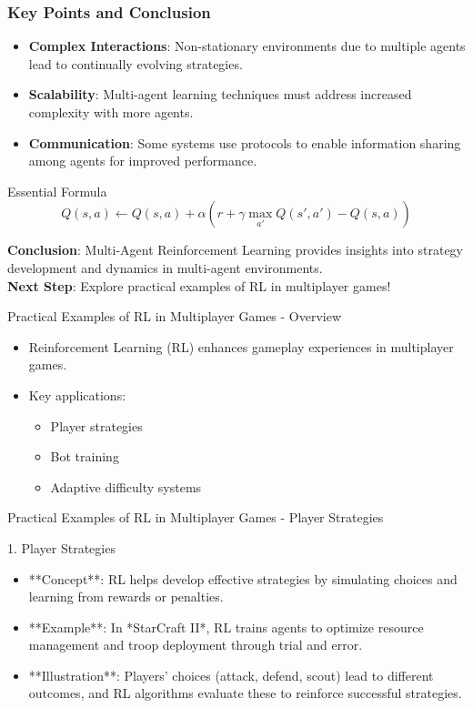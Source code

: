 \documentclass[aspectratio=169]{beamer}
\begin{document}
\begin{frame}[fragile]
    \frametitle{Key Points and Conclusion}
    \begin{itemize}
        \item \textbf{Complex Interactions}: Non-stationary environments due to multiple agents lead to continually evolving strategies.
        \item \textbf{Scalability}: Multi-agent learning techniques must address increased complexity with more agents.
        \item \textbf{Communication}: Some systems use protocols to enable information sharing among agents for improved performance.
    \end{itemize}
    \begin{block}{Essential Formula}
        \[
        Q(s, a) \leftarrow Q(s, a) + \alpha \left( r + \gamma \max_{a'} Q(s', a') - Q(s, a) \right)
        \]
    \end{block}
    \textbf{Conclusion}: Multi-Agent Reinforcement Learning provides insights into strategy development and dynamics in multi-agent environments. \\
    \textbf{Next Step}: Explore practical examples of RL in multiplayer games!
\end{frame}

\begin{frame}[fragile]{Practical Examples of RL in Multiplayer Games - Overview}
    \begin{itemize}
        \item Reinforcement Learning (RL) enhances gameplay experiences in multiplayer games.
        \item Key applications: 
        \begin{itemize}
            \item Player strategies
            \item Bot training
            \item Adaptive difficulty systems
        \end{itemize}
    \end{itemize}
\end{frame}

\begin{frame}[fragile]{Practical Examples of RL in Multiplayer Games - Player Strategies}
    \begin{block}{1. Player Strategies}
        \begin{itemize}
            \item **Concept**: RL helps develop effective strategies by simulating choices and learning from rewards or penalties.
            \item **Example**: In *StarCraft II*, RL trains agents to optimize resource management and troop deployment through trial and error.
            \item **Illustration**: Players' choices (attack, defend, scout) lead to different outcomes, and RL algorithms evaluate these to reinforce successful strategies.
        \end{itemize}
    \end{block}
\end{frame}
\end{document}
